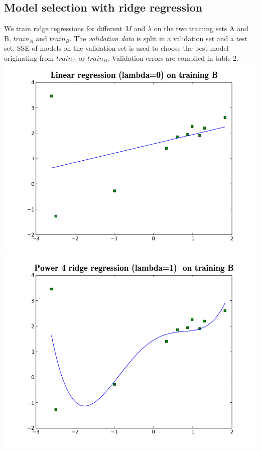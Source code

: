 \documentclass[twoside]{article}
\begin{document}
\subsection{Model selection with ridge regression}

We train ridge regressions for different $M$ and $\lambda$ on the two training sets A and B, $train_A$ and $train_B$. The \textit{validation data} is split in a validation set and a test set. SSE of models on the validation set is used to choose the best model originating from $train_A$ or $train_B$. Validation errors are compiled in table 2.\\

\begingroup
\centering
\includegraphics[scale=0.17]{./img/ridge_trainb_lin.png}
\includegraphics[scale=0.17]{./img/ridge_trainb_cub.png}
\end{document}
